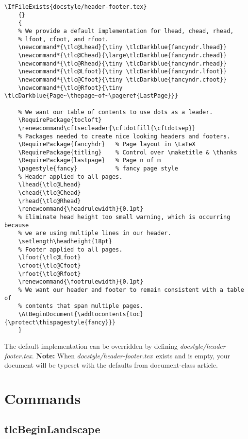 \documentclass[12pt]{tlc-article}
\def\tlcHF{\textit{docstyle/header-footer.tex}}
\begin{document}
\begin{lstlisting}[basicstyle=\tiny]
  \IfFileExists{docstyle/header-footer.tex}
    {}
    {
    % We provide a default implementation for lhead, chead, rhead, 
    % lfoot, cfoot, and rfoot.
    \newcommand*{\tlc@Lhead}{\tiny \tlcDarkblue{fancyndr.lhead}}
    \newcommand*{\tlc@Chead}{\large\tlcDarkblue{fancyndr.chead}}
    \newcommand*{\tlc@Rhead}{\tiny \tlcDarkblue{fancyndr.rhead}}
    \newcommand*{\tlc@Lfoot}{\tiny \tlcDarkblue{fancyndr.lfoot}}
    \newcommand*{\tlc@Cfoot}{\tiny \tlcDarkblue{fancyndr.cfoot}}
    \newcommand*{\tlc@Rfoot}{\tiny \tlcDarkblue{Page~\thepage~of~\pageref{LastPage}}}

    % We want our table of contents to use dots as a leader.
    \RequirePackage{tocloft}
    \renewcommand\cftsecleader{\cftdotfill{\cftdotsep}}
    % Packages needed to create nice looking headers and footers.
    \RequirePackage{fancyhdr}   % Page layout in \LaTeX
    \RequirePackage{titling}    % Control over \maketitle & \thanks
    \RequirePackage{lastpage}   % Page n of m
    \pagestyle{fancy}           % fancy page style
    % Header applied to all pages.
    \lhead{\tlc@Lhead}
    \chead{\tlc@Chead}
    \rhead{\tlc@Rhead}
    \renewcommand{\headrulewidth}{0.1pt}
    % Eliminate head height too small warning, which is occurring because
    % we are using multiple lines in our header.
    \setlength\headheight{18pt}
    % Footer applied to all pages.
    \lfoot{\tlc@Lfoot}
    \cfoot{\tlc@Cfoot}
    \rfoot{\tlc@Rfoot}
    \renewcommand{\footrulewidth}{0.1pt}
    % We want our header and footer to remain consistent with a table of
    % contents that span multiple pages.
    \AtBeginDocument{\addtocontents{toc}{\protect\thispagestyle{fancy}}}
    }
\end{lstlisting}

The default implementation can be overridden by defining \tlcHF. \textbf{Note:}
When \tlcHF\ exists and is empty, your document will be typeset with the
defaults from document-class article.


\section{Commands}
\subsection{tlcBeginLandscape}
\end{document}
